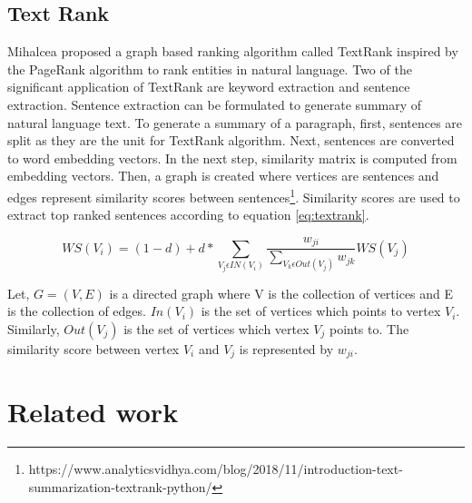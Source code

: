 \subsection{Text Rank}
Mihalcea \cite{mihalcea2004textrank} proposed a graph based ranking algorithm called TextRank inspired by the PageRank algorithm to rank entities in natural language. Two of the significant application of TextRank are keyword extraction and sentence extraction. Sentence extraction can be formulated to generate summary of natural language text. To generate a summary of a paragraph, first, sentences are split as they are the unit for TextRank algorithm. Next, sentences are converted to word embedding vectors. In the next step, similarity matrix is computed from embedding vectors. Then, a graph is created where vertices are sentences and edges represent similarity scores between sentences\footnote{https://www.analyticsvidhya.com/blog/2018/11/introduction-text-summarization-textrank-python/}. Similarity scores are used to extract top ranked sentences according to equation \ref{eq:textrank}.

\begin{equation}
\label{eq:textrank}
    WS(V_i) = (1 - d) + d * \sum_{V_j\epsilon IN(V_i) } \frac{w_{ji}}{\sum_{V_k \epsilon Out(V_j)} w_{jk}}  WS(V_j)
\end{equation}

Let, $ G = (V, E)$ is a directed graph where V is the collection of vertices and E is the collection of edges. $In(V_i)$ is the set of vertices which points to vertex $V_i$. Similarly, $Out(V_j)$ is the set of vertices which vertex $V_j$ points to. The similarity score between vertex $V_i$ and $V_j$ is represented by $w_{ji}$. 


\section{Related work}
